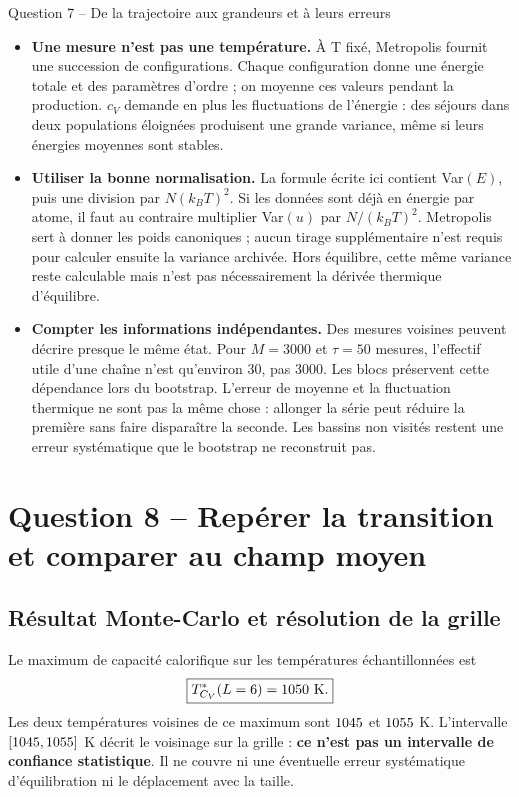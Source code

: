 \documentclass[10pt,a4paper]{article}
\begin{document}
\begin{oral}{Question 7 -- De la trajectoire aux grandeurs et à leurs erreurs}
\begin{itemize}
\item \textbf{Une mesure n'est pas une température.} À T fixé,
Metropolis fournit une succession de configurations. Chaque configuration
donne une énergie totale et des paramètres d'ordre ; on moyenne ces
valeurs pendant la production. $c_V$ demande en plus les fluctuations
de l'énergie : des séjours dans deux populations éloignées produisent
une grande variance, même si leurs énergies moyennes sont stables.
\item \textbf{Utiliser la bonne normalisation.} La formule écrite ici
contient Var$(E)$, puis une division par $N(k_BT)^2$. Si les données
sont déjà en énergie par atome, il faut au contraire multiplier
Var$(u)$ par $N/(k_BT)^2$. Metropolis sert à donner les poids
canoniques ; aucun tirage supplémentaire n'est requis pour calculer
ensuite la variance archivée. Hors équilibre,
cette même variance reste calculable mais n'est pas nécessairement
la dérivée thermique d'équilibre.
\item \textbf{Compter les informations indépendantes.} Des mesures
voisines peuvent décrire presque le même état. Pour $M=3000$ et
$\tau=50$ mesures, l'effectif utile d'une chaîne n'est qu'environ 30,
pas 3000. Les blocs préservent cette dépendance lors du bootstrap.
L'erreur de moyenne et la fluctuation thermique ne sont pas la même
chose : allonger la série peut réduire la première sans faire
disparaître la seconde. Les bassins non visités restent une erreur
systématique que le bootstrap ne reconstruit pas.
\end{itemize}
\end{oral}

\section{Question 8 -- Repérer la transition et comparer au champ moyen}
\subsection{Résultat Monte-Carlo et résolution de la grille}
Le maximum de capacité calorifique sur les températures échantillonnées est
\begin{equation}
\boxed{T^*_{C_V}(L=6)=1050\ \mathrm K.}
\end{equation}
Les deux températures voisines de ce maximum sont $1045$ et $1055$ K.
L'intervalle $[1045,1055]$ K décrit le voisinage sur la grille :
\textbf{ce n'est pas un intervalle de confiance statistique}. Il ne couvre
ni une éventuelle erreur systématique d'équilibration ni le déplacement
avec la taille.
\end{document}

